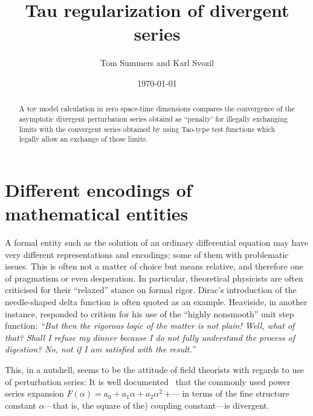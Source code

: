 \documentclass[%
  twocolumn,
 showpacs,
 showkeys,
 preprintnumbers,
 amsmath,amssymb,
 aps,
  pra,
  longbibliography,
 ]{revtex4-1}
\begin{document}
\title{Tau regularization of divergent series}


\author{Tom Summers and Karl Svozil}




\date{\today}

\begin{abstract}
A toy model calculation in zero space-time dimensions compares the convergence of the asymptotic divergent perturbation series obtaind as ``penalty' for illegally exchanging limits with the convergent series obtained by using Tao-type test functions which legally allow an exchange of those limits.
\end{abstract}



\maketitle

\section{Different encodings of mathematical entities}

A formal entity such as the solution of an ordinary differential equation may have very
different representations and encodings; some of them with problematic issues.
This is often not a matter of choice but means relative, and therefore one of pragmatism or even desperation.
In particular, theoretical physicists are often criticised for their ``relaxed'' stance on formal rigor.
Dirac's introduction of the needle-shaped delta function is often quoted as an example.
Heaviside, in another instance, responded to critism for his use of the ``highly nonsmooth''
unit step function\cite[p.~9, \S~225]{heaviside-EMT}:
{\em ``But then the
rigorous logic of the matter is not plain! Well, what of that?
Shall I refuse my dinner because I do not fully understand the
process of digestion? No, not if I am satisfied with the result.''}

This, in a nutshell, seems to be the attitude of field theorists
with regards to use of perturbation series:
It is well documented~\cite{PhysRev.85.631,LeGuillou-Zinn-Justin,Vainshtein1964-2002}
that the commonly used power series expansion
$F(\alpha )=a_0+a_1\alpha + a_2\alpha^2+ \cdots $
in terms of the fine structure constant $\alpha$---that is, the square of the) coupling constant---is divergent.
\end{document}
